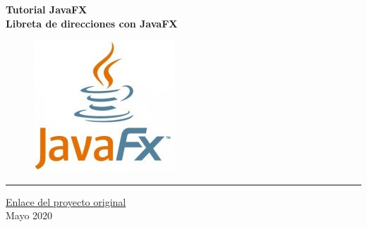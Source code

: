 \begin{titlepage}
	\begin{center}
		\huge{\textbf{Tutorial JavaFX}}
		\\
		\vspace{3mm}
		{\LARGE \textbf{Libreta de direcciones con JavaFX}}
		\\
		\vspace{5mm}
		
		\begin{figure}[h]
			\centering
			\includegraphics{img/logo-javafx}
		\end{figure}
	
		\textcolor{azul}{\rule{\linewidth}{0.75mm}}
		\textcolor{azul}{\href{https://code.makery.ch/es/library/javafx-tutorial/}{Enlace del proyecto original}}\\
		\vspace{5mm}
		Mayo 2020
		
	\end{center}
\end{titlepage}